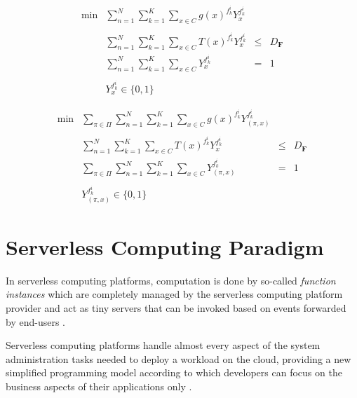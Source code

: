 \documentclass[10pt,a4paper]{report}
\theoremstyle{definition}
\begin{document}
	
\tableofcontents
\newpage


\begin{equation}
	\begin{array} {lllrr} 
		\text{min} & \displaystyle\sum_{n = 1}^N \sum_{k = 1}^K \sum_{x \in C} g(x)^{f_k^i} Y_x^{f_k^i} \\\\
		& \displaystyle\sum_{n = 1}^N \sum_{k = 1}^K \sum_{x \in C} T(x)^{f_k^i} Y_x^{f_k^i} & \leq &  D_{\textbf{F}} \\
		& \displaystyle\sum_{n = 1}^N \sum_{k = 1}^K \sum_{x \in C} Y_x^{f_k^i} & = & 1 \\\\
		& Y_x^{f_k^i} \in \lbrace 0, 1 \rbrace &&
	\end{array}
\end{equation}


\begin{equation}
	\begin{array} {lllrr} 
		\text{min} & \displaystyle\sum_{\pi \in \Pi} \sum_{n = 1}^N \sum_{k = 1}^K \sum_{x \in C} g(x)^{f_k^i} Y_{(\pi, x)}^{f_k^i} \\\\
		& \displaystyle\sum_{n = 1}^N \sum_{k = 1}^K \sum_{x \in C} T(x)^{f_k^i} Y_x^{f_k^i} & \leq &  D_{\textbf{F}} \\
		& \displaystyle\sum_{\pi \in \Pi} \sum_{n = 1}^N \sum_{k = 1}^K \sum_{x \in C} Y_{(\pi, x)}^{f_k^i} & = & 1 \\\\
		& Y_{(\pi, x)}^{f_k^i} \in \lbrace 0, 1 \rbrace &&
	\end{array}
\end{equation}


\newpage

\section{Serverless Computing Paradigm}

In serverless computing platforms, computation is done by so-called \textit{function instances} which are completely managed by the serverless computing platform provider and act as tiny servers that can be invoked based on events forwarded by end-users \cite{PMSCP}.

Serverless computing platforms handle almost every aspect of the system administration tasks needed to deploy a workload on the cloud, providing a new simplified programming model according to which developers can focus on the business aspects of their applications only \cite{COSE}.
\end{document}
